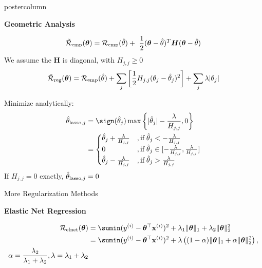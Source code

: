 \documentclass{beamer}
\newlength{\columnheight} %
\begin{document}
\begin{frame}[fragile]{}
\begin{columns}

\begin{column}{.31\textwidth}
\begin{beamercolorbox}[center]{postercolumn}
\begin{minipage}{.98\textwidth}
\parbox[t][\columnheight]{\textwidth}{
\begin{myblock}{}
\begin{codebox}
\textbf{Geometric Analysis}
\end{codebox}
$$ \mathcal{\tilde R}_{\text{emp}}(\thetav)= \mathcal{R}_{\text{emp}}(\thetah) + \ \frac{1}{2} (\thetav - \thetah)^T \bm{H} (\thetav - \thetah) $$
We assume the $\bm{H}$ is diagonal, with $H_{j,j} \geq 0$
$$\mathcal{\tilde R}_{\text{reg}}(\bm{\theta}) = \mathcal{R}_{\text{emp}}(\hat{\theta}) + \sum_j \left[ \frac{1}{2} H_{j,j} (\theta_j - \hat{\theta}_j)^2 \right] + \sum_j \lambda |\theta_j|$$

Minimize analytically:
     \begin{align*}\hat{\theta}_{\text{lasso},j} &= \sign(\hat{\theta}_j) \max \left\{ |\hat{\theta}_j| - \frac{\lambda}{H_{j,j}},0 \right\} \\
     &= \begin{cases} 
     \hat{\theta}_j + \frac{\lambda}{H_{j,j}} &, \text{if}   \;\hat{\theta}_j < -\frac{\lambda}{H_{j,j}} \\
       0 &, \text{if}   \;\hat{\theta}_j \in [-\frac{\lambda}{H_{j,j}}, \frac{\lambda}{H_{j,j}}] \\
     \hat{\theta}_j - \frac{\lambda}{H_{j,j}} &, \text{if}   \;\hat{\theta}_j > \frac{\lambda}{H_{j,j}} \\
     \end{cases}
     \end{align*}
If $H_{j,j} = 0$ exactly, $\hat{\theta}_{\text{lasso},j} = 0$
  
\end{myblock}

\begin{myblock}{More Regularization Methods}

\begin{codebox}
\textbf{Elastic Net Regression}
\end{codebox}
\begin{align*}
\mathcal{R}_{\text{elnet}}(\thetav) &=  \sumin (\yi - \thetav^\top \xi)^2 + \lambda_1 \|\thetav\|_1 + \lambda_2 \|\thetav\|_2^2 \\
&= \sumin (\yi - \thetav^\top \xi)^2 + \lambda \left( (1-\alpha) \|\thetav\|_1 + \alpha \|\thetav\|_2^2\right),\\
 \alpha=\frac{\lambda_2}{\lambda_1+\lambda_2}, \lambda=\lambda_1+\lambda_2
\end{align*}



\end{myblock}}
\end{minipage}
\end{beamercolorbox}
\end{column}
\end{columns}
\end{frame}
\end{document}
